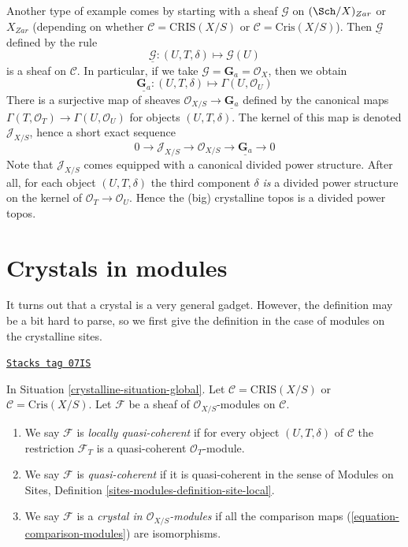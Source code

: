 \medskip\noindent
Another type of example comes by starting with a sheaf
$\mathcal{G}$ on $(\Sch/X)_{Zar}$ or $X_{Zar}$ (depending on whether
$\mathcal{C} = \text{CRIS}(X/S)$ or $\mathcal{C} = \text{Cris}(X/S)$).
Then $\underline{\mathcal{G}}$ defined by the rule
$$
\underline{\mathcal{G}} :
(U, T, \delta)
\longmapsto
\mathcal{G}(U)
$$
is a sheaf on $\mathcal{C}$. In particular, if we take
$\mathcal{G} = \mathbf{G}_a = \mathcal{O}_X$, then we obtain
$$
\underline{\mathbf{G}_a} :
(U, T, \delta)
\longmapsto
\Gamma(U, \mathcal{O}_U)
$$
There is a surjective map of sheaves
$\mathcal{O}_{X/S} \to \underline{\mathbf{G}_a}$ defined by the
canonical maps $\Gamma(T, \mathcal{O}_T) \to \Gamma(U, \mathcal{O}_U)$
for objects $(U, T, \delta)$. The kernel of this map is denoted
$\mathcal{J}_{X/S}$, hence a short exact sequence
$$
0 \to
\mathcal{J}_{X/S} \to
\mathcal{O}_{X/S} \to
\underline{\mathbf{G}_a} \to 0
$$
Note that $\mathcal{J}_{X/S}$ comes equipped with a canonical
divided power structure. After all, for each object $(U, T, \delta)$
the third component $\delta$ {\it is} a divided power structure on the
kernel of $\mathcal{O}_T \to \mathcal{O}_U$. Hence the (big)
crystalline topos is a divided power topos.

\section{Crystals in modules}
\label{crystalline-section-crystals}
It turns out that a crystal is a very general gadget. However, the
definition may be a bit hard to parse, so we first give the definition
in the case of modules on the crystalline sites.

\begin{definition}[Modules]
\label{crystalline-definition-modules}
\href{https://stacks.math.columbia.edu/tag/07IS}{\texttt{Stacks tag 07IS}}

In Situation \ref{crystalline-situation-global}.
Let $\mathcal{C} = \text{CRIS}(X/S)$ or $\mathcal{C} = \text{Cris}(X/S)$.
Let $\mathcal{F}$ be a sheaf of $\mathcal{O}_{X/S}$-modules on $\mathcal{C}$.
\begin{enumerate}
\item We say $\mathcal{F}$ is {\it locally quasi-coherent} if for every
object $(U, T, \delta)$ of $\mathcal{C}$ the restriction $\mathcal{F}_T$
is a quasi-coherent $\mathcal{O}_T$-module.
\item We say $\mathcal{F}$ is {\it quasi-coherent} if it is quasi-coherent
in the sense of
Modules on Sites, Definition \ref{sites-modules-definition-site-local}.
\item We say $\mathcal{F}$ is a {\it crystal in $\mathcal{O}_{X/S}$-modules}
if all the comparison maps (\ref{equation-comparison-modules}) are
isomorphisms.
\end{enumerate}
\end{definition}

